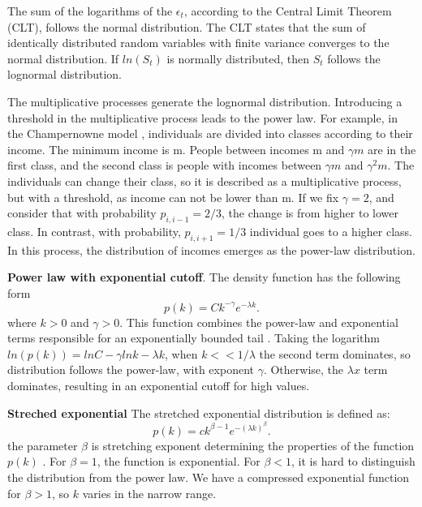 The sum of the logarithms of the $\epsilon_t$, according to the Central Limit Theorem (CLT), follows the normal distribution. The CLT states that the sum of identically distributed random variables with finite variance converges to the normal distribution. If $ln(S_t)$ is normally distributed, then $S_t$ follows the lognormal distribution.   

The multiplicative processes generate the lognormal distribution. Introducing a threshold in the multiplicative process leads to the power law. For example, in the Champernowne model \cite{caldarelli2007scalefree}, individuals are divided into classes according to their income. The minimum income is m. People between incomes m and $\gamma m$ are in the first class, and the second class is people with incomes between $\gamma m$ and $\gamma^2 m $. The individuals can change their class, so it is described as a multiplicative process, but with a threshold, as income can not be lower than m. If we fix $\gamma=2$, and consider that with probability $p_{i,i-1}=2/3$, the change is from higher to lower class. In contrast, with probability, $p_{i, i+1}=1/3$ individual goes to a higher class. In this process, the distribution of incomes emerges as the power-law distribution.

\textbf{Power law with exponential cutoff}. The density function has the following form 
\begin{equation}
p(k) = C k^{-\gamma}e^{-\lambda k}.
\end{equation}
where $k>0$ and $\gamma>0$. This function combines the power-law and exponential terms responsible for an exponentially bounded tail \cite{barabasi2016network}. Taking the logarithm $ln(p(k)) = lnC - \gamma lnk - \lambda k$, when $k<<1/\lambda$ the second term dominates, so distribution follows the power-law, with exponent $\gamma$. Otherwise, the $\lambda x$ term dominates, resulting in an exponential cutoff for high values. 

\textbf{Streched exponential} The stretched exponential distribution is defined as:
\begin{equation}
p(k) = c k^{\beta - 1}e^{-(\lambda k)^{\beta}}.
\end{equation}
the parameter $\beta$ is stretching exponent determining the properties of the function $p(k)$ \cite{barabasi2016network}. For $\beta=1$, the function is exponential. For $\beta<1$, it is hard to distinguish the distribution from the power law. We have a compressed exponential function for $\beta>1$, so $k$ varies in the narrow range.

